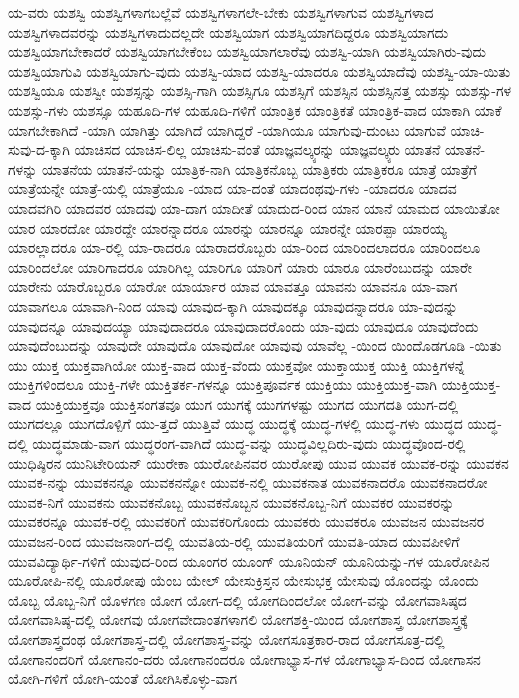 {ಯ-ವರು
ಯಶಸ್ವಿ
ಯಶಸ್ವಿಗಳಾಗಬಲ್ಲೆವೆ
ಯಶಸ್ವಿಗಳಾಗಲೇ-ಬೇಕು
ಯಶಸ್ವಿಗಳಾಗುವ
ಯಶಸ್ವಿಗಳಾದ
ಯಶಸ್ವಿಗಳಾದವರನ್ನು
ಯಶಸ್ವಿಗಳಾದುದಲ್ಲದೇ
ಯಶಸ್ವಿಯಾಗ
ಯಶಸ್ವಿಯಾಗದಿದ್ದರೂ
ಯಶಸ್ವಿಯಾಗದು
ಯಶಸ್ವಿಯಾಗಬೇಕಾದರೆ
ಯಶಸ್ವಿಯಾಗಬೇಕೆಂಬ
ಯಶಸ್ವಿಯಾಗಲಾರೆವು
ಯಶಸ್ವಿ-ಯಾಗಿ
ಯಶಸ್ವಿಯಾಗಿರು-ವುದು
ಯಶಸ್ವಿಯಾಗುವಿ
ಯಶಸ್ವಿಯಾಗು-ವುದು
ಯಶಸ್ವಿ-ಯಾದ
ಯಶಸ್ವಿ-ಯಾದರೂ
ಯಶಸ್ವಿಯಾದೆವು
ಯಶಸ್ವಿ-ಯಾ-ಯಿತು
ಯಶಸ್ವಿಯೂ
ಯಶಸ್ವೀ
ಯಶಸ್ಸನ್ನು
ಯಶಸ್ಸಿ-ಗಾಗಿ
ಯಶಸ್ಸಿಗೂ
ಯಶಸ್ಸಿಗೆ
ಯಶಸ್ಸಿನ
ಯಶಸ್ಸಿನತ್ತ
ಯಶಸ್ಸು
ಯಶಸ್ಸು-ಗಳ
ಯಶಸ್ಸು-ಗಳು
ಯಶಸ್ಸೂ
ಯಹೂದಿ-ಗಳ
ಯಹೂದಿ-ಗಳಿಗೆ
ಯಾಂತ್ರಿಕ
ಯಾಂತ್ರಿಕತೆ
ಯಾಂತ್ರಿಕ-ವಾದ
ಯಾಕಾಗಿ
ಯಾಕೆ
ಯಾಗಬೇಕಾಗಿದೆ
-ಯಾಗಿ
ಯಾಗಿತ್ತು
ಯಾಗಿದೆ
ಯಾಗಿದ್ದರೆ
-ಯಾಗಿಯೂ
ಯಾಗುವು-ದುಂಟು
ಯಾಗುವೆ
ಯಾಚಿ-ಸುವು-ದ-ಕ್ಕಾಗಿ
ಯಾಚಿಸದ
ಯಾಚಿಸ-ಲಿಲ್ಲ
ಯಾಚಿಸು-ವಂತೆ
ಯಾಜ್ಞವಲ್ಕ್ಯರನ್ನು
ಯಾಜ್ಞವಲ್ಕ್ಯರು
ಯಾತನೆ
ಯಾತನೆ-ಗಳನ್ನು
ಯಾತನೆಯ
ಯಾತನೆ-ಯನ್ನು
ಯಾತ್ರಿಕ-ನಾಗಿ
ಯಾತ್ರಿಕನೊಬ್ಬ
ಯಾತ್ರಿಕರು
ಯಾತ್ರಿಕರೂ
ಯಾತ್ರೆ
ಯಾತ್ರೆಗೆ
ಯಾತ್ರೆಯನ್ನೇ
ಯಾತ್ರೆ-ಯಲ್ಲಿ
ಯಾತ್ರೆಯೂ
-ಯಾದ
ಯಾ-ದಂತೆ
ಯಾದಂಥವು-ಗಳು
-ಯಾದರೂ
ಯಾದವ
ಯಾದವಗಿರಿ
ಯಾದವರ
ಯಾದವು
ಯಾ-ದಾಗ
ಯಾದೀತೆ
ಯಾದುದ-ರಿಂದ
ಯಾನ
ಯಾನೆ
ಯಾಮದ
ಯಾಯಿತೋ
ಯಾರ
ಯಾರದೋ
ಯಾರದ್ದೇ
ಯಾರನ್ನಾದರೂ
ಯಾರನ್ನು
ಯಾರನ್ನೂ
ಯಾರನ್ನೇ
ಯಾರಪ್ಪಾ
ಯಾರಯ್ಯ
ಯಾರಲ್ಲಾದರೂ
ಯಾ-ರಲ್ಲಿ
ಯಾ-ರಾದರೂ
ಯಾರಾದರೊಬ್ಬರು
ಯಾ-ರಿಂದ
ಯಾರಿಂದಲಾದರೂ
ಯಾರಿಂದಲೂ
ಯಾರಿಂದಲೋ
ಯಾರಿಗಾದರೂ
ಯಾರಿಗಿಲ್ಲ
ಯಾರಿಗೂ
ಯಾರಿಗೆ
ಯಾರು
ಯಾರೂ
ಯಾರೆಂಬುದನ್ನು
ಯಾರೇ
ಯಾರೇನು
ಯಾರೊಬ್ಬರೂ
ಯಾರೋ
ಯಾರ್ಯಾರ
ಯಾವ
ಯಾವತ್ತೂ
ಯಾವನು
ಯಾವನೂ
ಯಾ-ವಾಗ
ಯಾವಾಗಲೂ
ಯಾವಾಗಿ-ನಿಂದ
ಯಾವು
ಯಾವುದ-ಕ್ಕಾಗಿ
ಯಾವುದಕ್ಕೂ
ಯಾವುದನ್ನಾದರೂ
ಯಾ-ವುದನ್ನು
ಯಾವುದನ್ನೂ
ಯಾವುದಯ್ಯಾ
ಯಾವುದಾದರೂ
ಯಾವುದಾದರೊಂದು
ಯಾ-ವುದು
ಯಾವುದೂ
ಯಾವುದೆಂದು
ಯಾವುದೆಂಬುದನ್ನು
ಯಾವುದೇ
ಯಾವುದೊ
ಯಾವುದೋ
ಯಾವುವು
ಯಾವೆಲ್ಲ
-ಯಿಂದ
ಯಿಂದೊಡಗೂಡಿ
-ಯಿತು
ಯು
ಯುಕ್ತ
ಯುಕ್ತವಾಗಿಯೋ
ಯುಕ್ತ-ವಾದ
ಯುಕ್ತ-ವೆಂದು
ಯುಕ್ತವೋ
ಯುಕ್ತಾಯುಕ್ತ
ಯುಕ್ತಿ
ಯುಕ್ತಿಗಳನ್ನೆ
ಯುಕ್ತಿಗಳಿಂದಲೂ
ಯುಕ್ತಿ-ಗಳೇ
ಯುಕ್ತಿತರ್ಕ-ಗಳನ್ನೂ
ಯುಕ್ತಿಪೂರ್ವಕ
ಯುಕ್ತಿಯು
ಯುಕ್ತಿಯುಕ್ತ-ವಾಗಿ
ಯುಕ್ತಿಯುಕ್ತ-ವಾದ
ಯುಕ್ತಿಯುಕ್ತವೂ
ಯುಕ್ತಿಸಂಗತವೂ
ಯುಗ
ಯುಗಕ್ಕೆ
ಯುಗಗಳಷ್ಟು
ಯುಗದ
ಯುಗದತಿ
ಯುಗ-ದಲ್ಲಿ
ಯುಗದಲ್ಲೂ
ಯುಗದೊಳ್ಪಿಗೆ
ಯು-ತ್ತದೆ
ಯುತ್ತಿವೆ
ಯುದ್ಧ
ಯುದ್ಧಕ್ಕೆ
ಯುದ್ಧ-ಗಳಲ್ಲಿ
ಯುದ್ಧ-ಗಳು
ಯುದ್ಧದ
ಯುದ್ಧ-ದಲ್ಲಿ
ಯುದ್ಧಮಾಡು-ವಾಗ
ಯುದ್ಧರಂಗ-ವಾಗಿದೆ
ಯುದ್ಧ-ವನ್ನು
ಯುದ್ಧವಿಲ್ಲದಿರು-ವುದು
ಯುದ್ಧವೊಂದ-ರಲ್ಲಿ
ಯುಧಿಷ್ಠಿರನ
ಯುನಿಟೇರಿಯನ್
ಯುರೇಕಾ
ಯುರೋಪಿನವರ
ಯುರೋಪು
ಯುವ
ಯುವಕ
ಯುವಕ-ರನ್ನು
ಯುವಕನ
ಯುವಕ-ನನ್ನು
ಯುವಕನನ್ನೂ
ಯುವಕನನ್ನೋ
ಯುವಕ-ನಲ್ಲಿ
ಯುವಕನಾತ
ಯುವಕನಾದರೊ
ಯುವಕನಾದರೋ
ಯುವಕ-ನಿಗೆ
ಯುವಕನು
ಯುವಕನೊಬ್ಬ
ಯುವಕನೊಬ್ಬನ
ಯುವಕನೊಬ್ಬ-ನಿಗೆ
ಯುವಕರ
ಯುವಕರನ್ನು
ಯುವಕರನ್ನೂ
ಯುವಕ-ರಲ್ಲಿ
ಯುವಕರಿಗೆ
ಯುವಕರಿಗೊಂದು
ಯುವಕರು
ಯುವಕರೂ
ಯುವಜನ
ಯುವಜನರ
ಯುವಜನ-ರಿಂದ
ಯುವಜನಾಂಗ-ದಲ್ಲಿ
ಯುವತಿಯ-ರಲ್ಲಿ
ಯುವತಿಯರಿಗೆ
ಯುವತಿ-ಯಾದ
ಯುವಪೀಳಿಗೆ
ಯುವವಿದ್ಯಾರ್ಥಿ-ಗಳಿಗೆ
ಯುವುದ-ರಿಂದ
ಯೂಂಗರ
ಯೂಂಗ್
ಯೂನಿಯನ್
ಯೂನಿಯನ್ನು-ಗಳ
ಯೂರೋಪಿನ
ಯೂರೋಪಿ-ನಲ್ಲಿ
ಯೂರೋಪು
ಯೆಂಬ
ಯೇಲ್
ಯೇಸುಕ್ರಿಸ್ತನ
ಯೇಸುಭಕ್ತ
ಯೇಸುವು
ಯೊಂದನ್ನು
ಯೊಂದು
ಯೊಬ್ಬ
ಯೊಬ್ಬ-ನಿಗೆ
ಯೊಳಗಣ
ಯೋಗ
ಯೋಗ-ದಲ್ಲಿ
ಯೋಗದಿಂದಲೋ
ಯೋಗ-ವನ್ನು
ಯೋಗವಾಸಿಷ್ಠದ
ಯೋಗವಾಸಿಷ್ಠ-ದಲ್ಲಿ
ಯೋಗವು
ಯೋಗವೇದಾಂತಗಳಾಗಲಿ
ಯೋಗಶಕ್ತಿ-ಯಿಂದ
ಯೋಗಶಾಸ್ತ್ರ
ಯೋಗಶಾಸ್ತ್ರಕ್ಕೆ
ಯೋಗಶಾಸ್ತ್ರದಂಥ
ಯೋಗಶಾಸ್ತ್ರ-ದಲ್ಲಿ
ಯೋಗಶಾಸ್ತ್ರ-ವನ್ನು
ಯೋಗಸೂತ್ರಕಾರ-ರಾದ
ಯೋಗಸೂತ್ರ-ದಲ್ಲಿ
ಯೋಗಾನಂದರಿಗೆ
ಯೋಗಾನಂ-ದರು
ಯೋಗಾನಂದರೂ
ಯೋಗಾಭ್ಯಾಸ-ಗಳ
ಯೋಗಾಭ್ಯಾಸ-ದಿಂದ
ಯೋಗಾಸನ
ಯೋಗಿ-ಗಳಿಗೆ
ಯೋಗಿ-ಯಂತೆ
ಯೋಗಿಸಿಕೊಳ್ಳು-ವಾಗ
}
